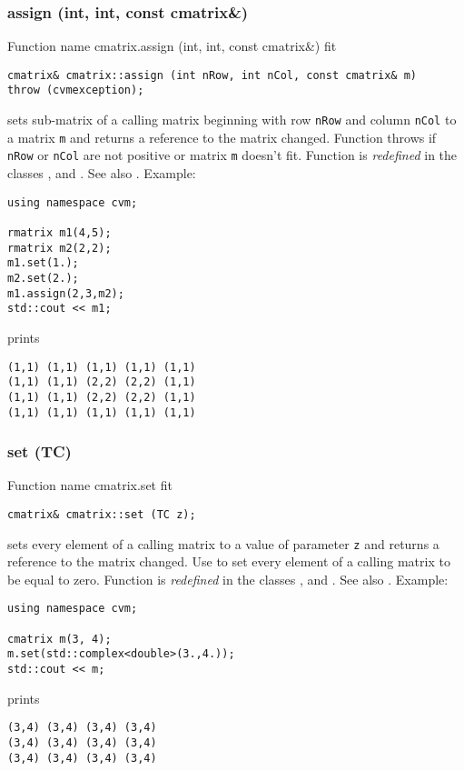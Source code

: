\subsubsection{assign (int, int, const cmatrix\&)}
Function%
\pdfdest name {cmatrix.assign (int, int, const cmatrix&)} fit
\begin{verbatim}
cmatrix& cmatrix::assign (int nRow, int nCol, const cmatrix& m)
throw (cvmexception);
\end{verbatim}
sets sub-matrix of a calling matrix beginning with \Based row
\verb"nRow" and column \verb"nCol" to a matrix \verb"m" and
returns a reference to the matrix changed. Function throws 
  if \verb"nRow"
or \verb"nCol" are not positive or matrix \verb"m" doesn't fit.
Function is \emph{redefined} in the classes
,  
and .
See also .
Example:
\begin{Verbatim}
using namespace cvm;

rmatrix m1(4,5);
rmatrix m2(2,2);
m1.set(1.);
m2.set(2.);
m1.assign(2,3,m2);
std::cout << m1;
\end{Verbatim}
prints
\begin{Verbatim}
(1,1) (1,1) (1,1) (1,1) (1,1)
(1,1) (1,1) (2,2) (2,2) (1,1)
(1,1) (1,1) (2,2) (2,2) (1,1)
(1,1) (1,1) (1,1) (1,1) (1,1)
\end{Verbatim}
\newpage



\subsubsection{set (TC)}
Function%
\pdfdest name {cmatrix.set} fit
\begin{verbatim}
cmatrix& cmatrix::set (TC z);
\end{verbatim}
sets every element of a calling matrix to a value of
parameter \verb"z" and returns a reference to
the matrix changed.
Use  to set every element
of a calling matrix to be equal to zero.
Function is \emph{redefined} in the classes
,  
and .
See also .
Example:
\begin{Verbatim}
using namespace cvm;

cmatrix m(3, 4);
m.set(std::complex<double>(3.,4.));
std::cout << m;
\end{Verbatim}
prints
\begin{Verbatim}
(3,4) (3,4) (3,4) (3,4)
(3,4) (3,4) (3,4) (3,4)
(3,4) (3,4) (3,4) (3,4)
\end{Verbatim}
\newpage




